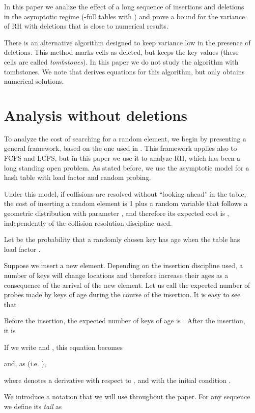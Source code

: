 \documentclass[proceedings]{aofa}
\begin{document}
In this paper we analize the effect of a long sequence of insertions
and deletions in the asymptotic regime (-full tables with )
and prove a bound for the variance of RH with deletions that is close to numerical results.

There is an alternative algorithm designed to keep variance low in the presence of deletions. This method marks cells as deleted, but keeps the key values (these cells are called {\em tombstones}).
In this paper we do not study the algorithm with tombstones.
We note that \cite{Mit} derives equations for this algorithm, but only obtains
numerical solutions.


\section{Analysis without deletions}
\label{sinborrar}
To analyze the cost of searching for a random element, we begin by presenting a general framework, 
based on the one used in \cite{cunto1988two}. 
This framework applies also to FCFS and LCFS, but in this paper
we use it to analyze RH, which has been a long standing open problem.
As stated before, we use the asymptotic model for a hash table with load factor  and random probing.

Under this model, if collisions are resolved without ``looking ahead" in the table, the cost of inserting a random element is 1 plus a random variable that follows
a geometric distribution with parameter , and therefore its expected cost is , independently of the collision resolution discipline used.

Let  be the probability that a randomly chosen key has
age  when the table has load factor .

Suppose we insert a new element.
Depending on the insertion discipline used, a number of keys will change
locations and therefore increase their ages as a consequence of the arrival of the new element.
Let us call  the expected number of probes made by keys of age  during the course of the insertion.
It is easy to see that

Before the insertion, the expected number of keys of age  is
.
After the insertion, it is

If we write  and , this equation becomes

and, as  (i.e. ),

where  denotes a derivative with respect to , and with the initial condition .

We introduce a notation that we will use throughout the paper. For any sequence  we define its {\em tail}  as
\end{document}
